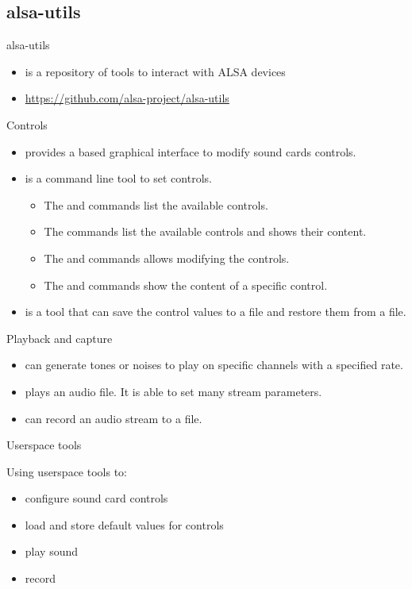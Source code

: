 \subsection{alsa-utils}

\begin{frame}{alsa-utils}
  \begin{itemize}
  \item {} is a repository of tools to interact with
    ALSA devices
  \item \url{https://github.com/alsa-project/alsa-utils}
  \end{itemize}
\end{frame}

\begin{frame}{Controls}
  \begin{itemize}
  \item {} provides a  based graphical
    interface to modify sound cards controls.
  \item {} is a command line tool to set controls.
    \begin{itemize}
    \item The  and  commands list the
      available controls.
    \item The  commands list the
      available controls and shows their content.
    \item The  and  commands allows modifying
      the controls.
    \item The  and  commands show the content of
      a specific control.
    \end{itemize}
  \item {} is a tool that can save the control values to a
    file and restore them from a file.
  \end{itemize}
\end{frame}

\begin{frame}{Playback and capture}
  \begin{itemize}
  \item {} can generate tones or noises to play on
    specific channels with a specified rate.
  \item {} plays an audio file. It is able to set many
    stream parameters.
  \item {} can record an audio stream to a file.
  \end{itemize}
\end{frame}

\setupdemoframe
{Userspace tools}
{
  Using userspace tools to:
  \begin{itemize}
  \item configure sound card controls
  \item load and store default values for controls
  \item play sound
  \item record
  \end{itemize}
}
